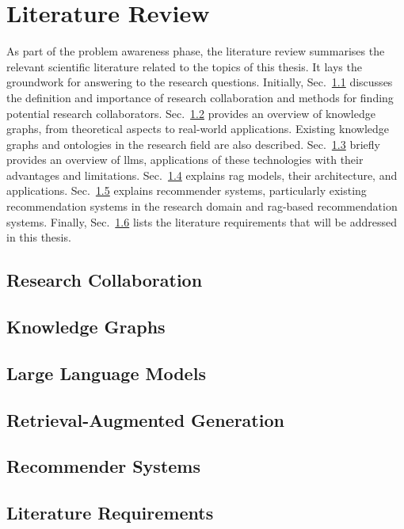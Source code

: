 \chapter{Literature Review}\label{chap:literature-review}
As part of the problem awareness phase, the literature review summarises the relevant scientific literature related to the topics of this thesis.
It lays the groundwork for answering to the research questions.
Initially, Sec.~\ref{sec:research-collaboration} discusses the definition and importance of research collaboration and methods for finding potential research collaborators.
Sec.~\ref{sec:knowledge-graphs} provides an overview of knowledge graphs, from theoretical aspects to real-world applications.
Existing knowledge graphs and ontologies in the research field are also described.
Sec.~\ref{sec:large-language-models} briefly provides an overview of \glspl{llm}, applications of these technologies with their advantages and limitations.
Sec.~\ref{sec:retrieval-augmented-generation} explains \gls{rag} models, their architecture, and applications.
Sec.~\ref{sec:recommender-systems} explains recommender systems, particularly existing recommendation systems in the research domain and \gls{rag}-based recommendation systems.
Finally, Sec.~\ref{sec:literature-requirements} lists the literature requirements that will be addressed in this thesis.
%
\section{Research Collaboration}\label{sec:research-collaboration}

%
\section{Knowledge Graphs}\label{sec:knowledge-graphs}

%
\section{Large Language Models}\label{sec:large-language-models}

%
\section{Retrieval-Augmented Generation}\label{sec:retrieval-augmented-generation}

%
\section{Recommender Systems}\label{sec:recommender-systems}

%
\section{Literature Requirements}\label{sec:literature-requirements}

